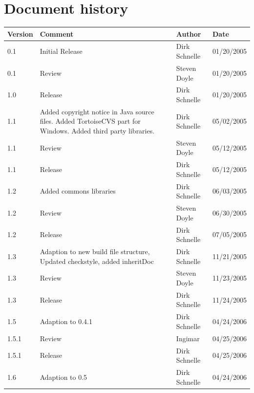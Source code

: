\documentclass[11pt,a4paper]{article}
\begin{document}
\section*{Document history}

\begin{tabular}{|l|p{5cm}|l|l|}
\hline
\textbf{Version} & \textbf{Comment} & \textbf{Author} & \textbf{Date} \\
\hline
\hline
0.1 & Initial Release & Dirk Schnelle & 01/20/2005 \\
\hline
0.1 & Review & Steven Doyle & 01/20/2005 \\
\hline
1.0 & Release & Dirk Schnelle & 01/20/2005 \\
\hline
1.1 & Added copyright notice in Java source files.
Added TortoiseCVS part for Windows.
Added third party libraries. & Dirk Schnelle & 
 05/02/2005 \\
\hline
1.1 & Review & Steven Doyle & 05/12/2005 \\
\hline
1.1 & Release & Dirk Schnelle & 05/12/2005 \\
\hline
1.2 & Added commons libraries & Dirk Schnelle & 06/03/2005 \\
\hline
1.2 & Review & Steven Doyle & 06/30/2005 \\
\hline
1.2 & Release & Dirk Schnelle & 07/05/2005 \\
\hline
1.3 & Adaption to new build file structure, Updated checkstyle, added 
inheritDoc & Dirk Schnelle & 11/21/2005 \\
\hline
1.3 & Review & Steven Doyle & 11/23/2005 \\
\hline
1.3 & Release & Dirk Schnelle & 11/24/2005 \\
\hline
1.5 & Adaption to 0.4.1  & Dirk Schnelle & 04/24/2006 \\
\hline
1.5.1 & Review & Ingimar  & 04/25/2006 \\
\hline
1.5.1 & Release  & Dirk Schnelle & 04/25/2006 \\
\hline
1.6 & Adaption to 0.5  & Dirk Schnelle & 04/24/2006 \\
\hline
\end{tabular}




\end{document}
